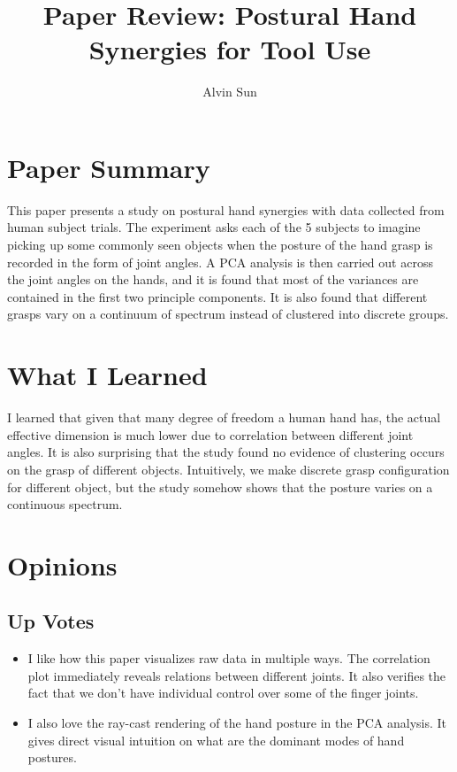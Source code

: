 \documentclass[10pt, twocolumn]{article}
\title{Paper Review: Postural Hand Synergies for Tool Use}
\author{Alvin Sun}
\begin{document}
\maketitle

\section{Paper Summary}
This paper presents a study on postural hand synergies with data collected
from human subject trials. The experiment asks each of the 5 subjects to imagine
picking up some commonly seen objects when the posture of the hand grasp 
is recorded in the form of joint angles. A PCA analysis is then carried out 
across the joint angles on the hands, and 
it is found that most of the variances are contained in the first two principle
components. It is also found that different grasps vary on a
continuum of spectrum instead of clustered into discrete groups.

\section{What I Learned}

I learned that given that many degree of freedom a human hand
has, the actual effective dimension is much lower due to correlation between different
joint angles. It is also surprising that the study found no evidence of 
clustering occurs on the grasp of different objects. Intuitively, we make
discrete grasp configuration for different object, but the study somehow shows
that the posture varies on a continuous spectrum.

\section{Opinions}

\subsection{Up Votes}
\begin{itemize}
    \item I like how this paper visualizes raw data in multiple ways. 
        The correlation plot immediately
        reveals relations between different joints. It also verifies the 
        fact that we don't have individual control over some of the finger joints.
    \item I also love the ray-cast rendering of the hand posture in the PCA 
        analysis. It gives direct visual intuition on what are the dominant modes 
        of hand postures.
\end{itemize}
\end{document}
